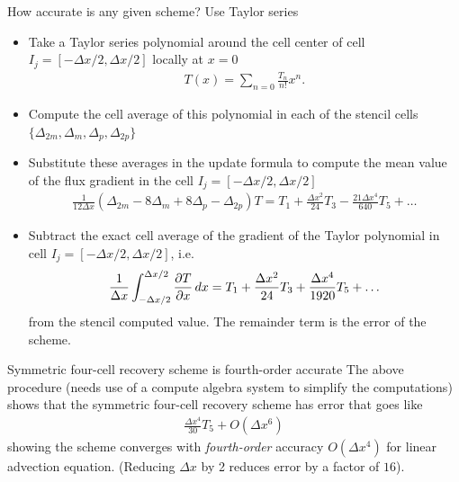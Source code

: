 \documentclass[aspectratio=169]{beamer}
\newcommand{\mypause}{}
\newcommand{\pfrac}[2]{\frac{\partial #1}{\partial #2}}
\newcommand{\cramplist}{
	\setlength{\itemsep}{0in}
	\setlength{\partopsep}{0in}
	\setlength{\topsep}{0in}}
\begin{document}
\begin{frame}{How accurate is any given scheme? Use Taylor series}
  \footnotesize%
  \begin{itemize}\cramplist
  \item Take a Taylor series polynomial around the cell center of cell
    $I_j = [-\Delta x/2, \Delta x/2]$ locally at $x=0$
    \begin{align*}
      T(x) = \sum_{n=0} \frac{T_n}{n!} x^n.
    \end{align*}
    \mypause%
  \item Compute the cell average of this polynomial in each of the
    stencil cells $\{\Delta_{2m}, \Delta_m, \Delta_p, \Delta_{2p} \}$
    \mypause%
  \item Substitute these averages in the update formula to compute the
    mean value of the flux gradient in the cell
    $I_j = [-\Delta x/2, \Delta x/2]$
    \begin{align*}
      \frac{1}{12 \Delta x} (\Delta_{2m} - 8\Delta_m + 8 \Delta_p -
      \Delta_{2p}) T
      =
      T_1 + \frac{\Delta x^2}{24} T_3  - \frac{21 \Delta x^4}{640} T_5 + \ldots
    \end{align*}
    \mypause%
  \item Subtract the exact cell average of the gradient of the Taylor
    polynomial in cell $I_j = [-\Delta x/2, \Delta x/2]$, i.e.
    \begin{align*}
      \frac{1}{\Delta x}\int_{-\Delta x/2}^{\Delta x/2} \pfrac{T}{x} \thinspace dx
      =
      T_1 + \frac{\Delta x^2}{24} T_3  + \frac{\Delta x^4}{1920} T_5 + \ldots
    \end{align*}
    from the stencil computed value. The remainder term is the error
    of the scheme.
  \end{itemize}  
\end{frame}

\begin{frame}{Symmetric four-cell recovery scheme is fourth-order
    accurate}
  The above procedure (needs use of a compute algebra system to
  simplify the computations) shows that the symmetric four-cell
  recovery scheme has error that goes like
  \begin{align*}
      \frac{\Delta x^4}{30} T_5 + O(\Delta x^6)
  \end{align*}
  showing the scheme converges with \emph{fourth-order} accuracy
  $O(\Delta x^4)$ for linear advection equation. (Reducing $\Delta x$
  by 2 reduces error by a factor of $16$).

\end{frame}
\end{document}
